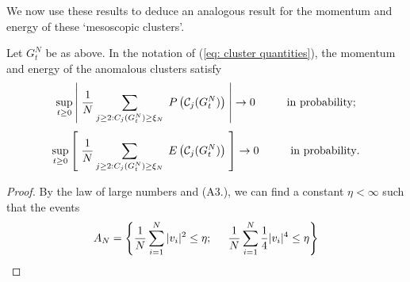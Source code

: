 We now use these results to deduce an analogous result for the momentum and energy of these `mesoscopic clusters'. \begin{corollary}\label{corr: anomalous clusters 3}  Let $G^N_t$ be as above. In the notation of (\ref{eq: cluster quantities}), the momentum and energy of the anomalous clusters satisfy \begin{equation}
           \sup_{t\ge 0} \left|\hspace{0.1cm}\frac{1}{N}\sum_{j\ge 2: C_j(G^N_t)\ge \xi_N} \hspace{0.1cm} P\left(\mathcal{C}_j(G^N_t)\right) \hspace{0.1cm}\right| \rightarrow 0 \hspace{1cm} \text{in probability};
       \end{equation} \begin{equation}
           \sup_{t\ge 0} \left[\hspace{0.1cm}\frac{1}{N}\sum_{j\ge 2: C_j(G^N_t)\ge \xi_N} \hspace{0.1cm} E\left(\mathcal{C}_j(G^N_t)\right) \hspace{0.1cm}\right] \rightarrow 0 \hspace{1cm} \text{in probability}.
       \end{equation}   \end{corollary} \begin{proof} By the law of large numbers and (A3.), we can find a constant $\eta<\infty$ such that the events \begin{equation}
        A_N =\left\{\frac{1}{N}\sum_{i=1}^N |v_i|^2 \le \eta;\hspace{0.5cm} \frac{1}{N}\sum_{i=1}^N \frac{1}{4}|v_i|^4\le \eta\right\}

\end{equation}
\end{proof}
